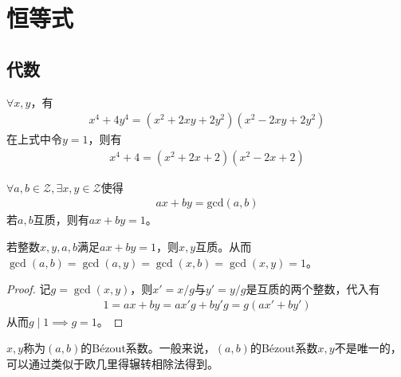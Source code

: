 
\chapter{恒等式}
\label{chap:identities}

\section{代数}
\label{sec:algebra-identities}

\begin{theorem}
  $\forall x,y$，有
  \begin{align*}
    x^4 + 4y^4 = (x^2 + 2xy + 2y^2)(x^2 - 2xy + 2y^2)
  \end{align*}
  在上式中令$y=1$，则有
  \begin{align*}
    x^4 + 4 = (x^2 + 2x + 2)(x^2 - 2x + 2)
  \end{align*}
\end{theorem}

\begin{theorem}\label{th:Bezout}
  $\forall a,b\in\mathcal{Z},\exists x,y\in\mathcal{Z}$使得
  \begin{align*}
    ax+by=\mathrm{gcd}(a,b)
  \end{align*}
  若$a,b$互质，则有$ax+by=1$。
\end{theorem}

\begin{theorem}\label{th:inverse-bezout}
  若整数$x,y,a,b$满足$ax+by=1$，则$x,y$互质。从而$\gcd(a,b)=\gcd(a,y)=\gcd(x,b)=\gcd(x,y)=1$。
\end{theorem}
\begin{proof}
  记$g=\gcd(x,y)$，则$x'=x/g$与$y'=y/g$是互质的两个整数，代入有
  \begin{align*}
    1=ax+by=ax'g+by'g=g(ax'+by')
  \end{align*}
  从而$g\mid 1\implies g=1$。
\end{proof}

$x,y$称为$(a,b)$的B\'ezout系数。一般来说，$(a,b)$的B\'ezout系数$x,y$不是唯一的，可以通过类似于欧几里得辗转相除法得到。

